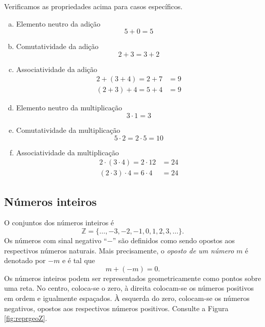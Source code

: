 \begin{ex}
  Verificamos as propriedades acima para casos específicos.
  \begin{enumerate}[a)]
  \item Elemento neutro da adição
    \begin{equation}
      5 + 0 = 5
    \end{equation}
  \item Comutatividade da adição
    \begin{equation}
      2 + 3 = 3 + 2
    \end{equation}
  \item Associatividade da adição
    \begin{align}
      2 + (3 + 4) = 2 + 7 &= 9\\
      (2 + 3) + 4 = 5 + 4 &= 9
    \end{align}
  \item Elemento neutro da multiplicação
    \begin{equation}
      3 \cdot 1 = 3
    \end{equation}
  \item Comutatividade da multiplicação
    \begin{equation}
      5\cdot 2 = 2\cdot 5 = 10
    \end{equation}
  \item Associatividade da multiplicação
    \begin{align}
      2\cdot(3\cdot 4) = 2\cdot 12 &= 24\\
      (2\cdot 3)\cdot 4 = 6\cdot 4 &= 24
    \end{align}
  \end{enumerate}
\end{ex}

\subsection{Números inteiros}

O conjuntos dos números inteiros é
\begin{equation}
  \mathbb{Z} = \{\ldots, -3, -2 , -1, 0, 1, 2, 3, \ldots\}.
\end{equation}
Os números com sinal negativo ``$-$'' são definidos como sendo opostos aos respectivos números naturais. Mais precisamente, o \emph{oposto de um número} $m$ é denotado por $-m$ e é tal que
\begin{equation}
  m + (-m) = 0.
\end{equation}
Os números inteiros podem ser representados geometricamente como pontos sobre uma reta. No centro, coloca-se o zero, à direita colocam-se os números positivos em ordem e igualmente espaçados. À esquerda do zero, colocam-se os números negativos, opostos aos respectivos números positivos. Consulte a Figura \ref{fig:reprgeoZ}.

